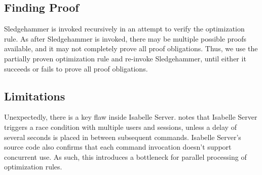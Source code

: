 \documentclass[conference,a4paper,english,10pt]{IEEEtran}[2015/08/26]
\begin{document}


\subsection{Finding Proof}
\label{sec:findproof}


Sledgehammer is invoked recursively in an attempt to verify the optimization rule. As after Sledgehammer is invoked, there may be multiple 
possible proofs available, and it may not completely prove all proof obligations. Thus, we use the partially proven optimization rule and 
re-invoke Sledgehammer, until either it succeeds or fails to prove all proof obligations.

\subsection{Limitations}
\label{sec:limitations}

Unexpectedly, there is a key flaw inside Isabelle Server.
\citet{kobschatzki_unexpected_2024} notes that Isabelle Server triggers a race condition with multiple users and sessions, unless a 
delay of several seconds is placed in between subsequent commands. Isabelle Server's source code also confirms that each command invocation 
doesn't support concurrent use. As such, this introduces a bottleneck for parallel processing of optimization rules.
\end{document}
